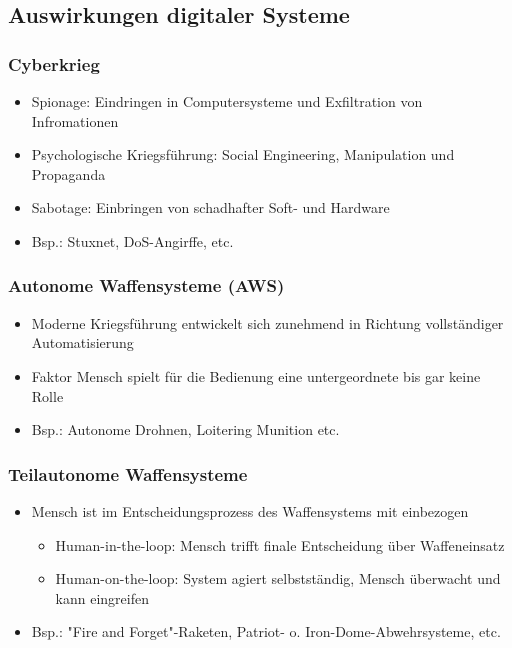 \documentclass[12pt]{beamer}
\begin{document}
\subsection{Auswirkungen digitaler Systeme}

\begin{frame}
    \frametitle{Cyberkrieg}
    \begin{itemize}
        \item Spionage: Eindringen in Computersysteme und Exfiltration von Infromationen \cite{cyberkrieg}
        \item Psychologische Kriegsführung: Social Engineering, Manipulation und Propaganda \cite{cyberkrieg}
        \item Sabotage: Einbringen von schadhafter Soft- und Hardware \cite{cyberkrieg}
        \item Bsp.: Stuxnet, DoS-Angirffe, etc.
    \end{itemize}
\end{frame}

\begin{frame}
    \frametitle{Autonome Waffensysteme (AWS)}
    \begin{itemize}
        \item Moderne Kriegsführung entwickelt sich zunehmend in Richtung vollständiger Automatisierung
        \item Faktor Mensch spielt für die Bedienung eine untergeordnete bis gar keine Rolle \cite{amnesty}
        \item Bsp.: Autonome Drohnen, Loitering Munition etc. \cite{amnesty}
    \end{itemize}
\end{frame}

\begin{frame}
    \frametitle{Teilautonome Waffensysteme}
    \begin{itemize}
        \item Mensch ist im Entscheidungsprozess des Waffensystems mit einbezogen
        \begin{itemize}
            \item Human-in-the-loop: Mensch trifft finale Entscheidung über Waffeneinsatz \cite{kas}
            \item Human-on-the-loop: System agiert selbstständig, Mensch überwacht und kann eingreifen \cite{kas}
        \end{itemize}
        \item Bsp.: "Fire and Forget"-Raketen, Patriot- o. Iron-Dome-Abwehrsysteme, etc.
    \end{itemize}
\end{frame}
\end{document}
